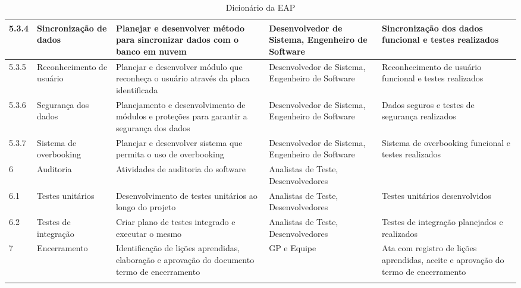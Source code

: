 \begin{longtable}{ l  p{}  p{}  p{}  p{}  }
		5.3.4       & Sincronização de dados                                  & Planejar e desenvolver método para sincronizar dados com o banco em nuvem & Desenvolvedor de Sistema, Engenheiro de Software & Sincronização dos dados funcional e testes realizados \\*
		\midrule
		5.3.5       & Reconhecimento de usuário                                & Planejar e desenvolver módulo que reconheça o usuário através da placa identificada & Desenvolvedor de Sistema, Engenheiro de Software & Reconhecimento de usuário funcional e testes realizados \\*
		\midrule
		5.3.6       & Segurança dos dados                                      & Planejamento e desenvolvimento de módulos e proteções para garantir a segurança dos dados & Desenvolvedor de Sistema, Engenheiro de Software & Dados seguros e testes de segurança realizados \\*
		\midrule
		5.3.7       & Sistema de overbooking                                    & Planejar e desenvolver sistema que permita o uso de overbooking & Desenvolvedor de Sistema, Engenheiro de Software & Sistema de overbooking funcional e testes realizados \\*
		\midrule
		6           & Auditoria                                                 & Atividades de auditoria do software & Analistas de Teste, Desenvolvedores & \\*
		\midrule
		6.1         & Testes unitários                                         & Desenvolvimento de testes unitários ao longo do projeto & Analistas de Teste, Desenvolvedores & Testes unitários desenvolvidos \\*
		\midrule
		6.2         & Testes de integração                                    & Criar plano de testes integrado e executar o mesmo & Analistas de Teste, Desenvolvedores & Testes de integração planejados e realizados \\*
		\midrule
		7           & Encerramento                                              & Identificação de lições aprendidas, elaboração e aprovação do documento termo de encerramento & GP e Equipe & Ata com registro de lições aprendidas, aceite e aprovação do termo de encerramento \\*
		\bottomrule
	\centering
	\caption{Dicionário da EAP}
\end{longtable}